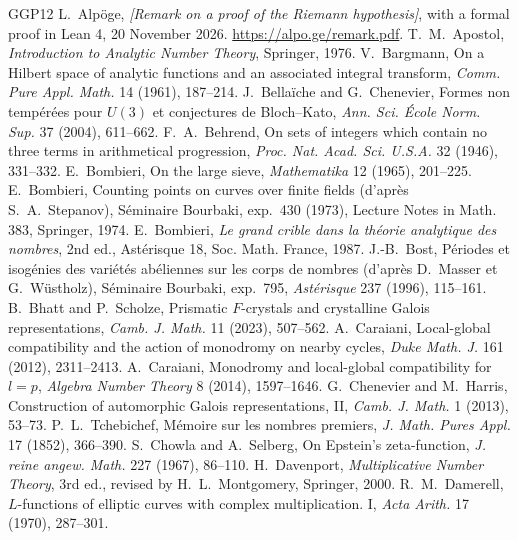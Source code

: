 \documentclass[11pt,letterpaper]{article}
\begin{document}
\begin{thebibliography}{GGP12}\small
{} L.~Alp\"oge, \emph{[Remark on a proof of the Riemann hypothesis]}, with a formal proof in Lean 4, 20 November 2026. \url{https://alpo.ge/remark.pdf}.
 T.~M.~Apostol, \emph{Introduction to Analytic Number Theory}, Springer, 1976.
 V.~Bargmann, On a Hilbert space of analytic functions and an associated integral transform, \emph{Comm. Pure Appl. Math.} 14 (1961), 187--214.
 J.~Bella\"iche and G.~Chenevier, Formes non temp\'er\'ees pour $U(3)$ et conjectures de Bloch--Kato, \emph{Ann. Sci. \'Ecole Norm. Sup.} 37 (2004), 611--662.
 F.~A.~Behrend, On sets of integers which contain no three terms in arithmetical progression, \emph{Proc. Nat. Acad. Sci. U.S.A.} 32 (1946), 331--332.
 E.~Bombieri, On the large sieve, \emph{Mathematika} 12 (1965), 201--225.
 E.~Bombieri, Counting points on curves over finite fields (d'apr\`es S.~A.~Stepanov), S\'eminaire Bourbaki, exp.~430 (1973), Lecture Notes in Math. 383, Springer, 1974.
 E.~Bombieri, \emph{Le grand crible dans la th\'eorie analytique des nombres}, 2nd ed., Ast\'erisque 18, Soc. Math. France, 1987.
 J.-B.~Bost, P\'eriodes et isog\'enies des vari\'et\'es ab\'eliennes sur les corps de nombres (d'apr\`es D.~Masser et G.~W\"ustholz), S\'eminaire Bourbaki, exp.~795, \emph{Ast\'erisque} 237 (1996), 115--161.
 B.~Bhatt and P.~Scholze, Prismatic $F$-crystals and crystalline Galois representations, \emph{Camb. J. Math.} 11 (2023), 507--562.
 A.~Caraiani, Local-global compatibility and the action of monodromy on nearby cycles, \emph{Duke Math. J.} 161 (2012), 2311--2413.
 A.~Caraiani, Monodromy and local-global compatibility for $l=p$, \emph{Algebra Number Theory} 8 (2014), 1597--1646.
 G.~Chenevier and M.~Harris, Construction of automorphic Galois representations, II, \emph{Camb. J. Math.} 1 (2013), 53--73.
 P.~L.~Tchebichef, M\'emoire sur les nombres premiers, \emph{J. Math. Pures Appl.} 17 (1852), 366--390.
 S.~Chowla and A.~Selberg, On Epstein's zeta-function, \emph{J. reine angew. Math.} 227 (1967), 86--110.
 H.~Davenport, \emph{Multiplicative Number Theory}, 3rd ed., revised by H.~L.~Montgomery, Springer, 2000.
 R.~M.~Damerell, $L$-functions of elliptic curves with complex multiplication. I, \emph{Acta Arith.} 17 (1970), 287--301.

\end{thebibliography}
\end{document}
